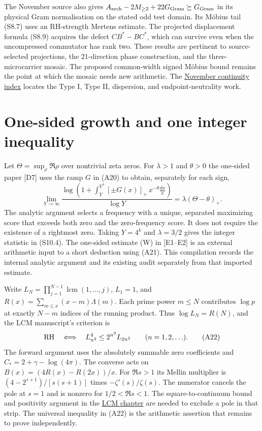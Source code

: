 \documentclass[
  10pt,
  a4paper,
  10pt,
  oneside,
  openany]{book}
\begin{document}
The November source also gives
\(A_{\rm arch}-2M_{\ge2}+22G_{\rm Gram}\succeq G_{\rm Gram}\) in its
physical Gram normalisation on the stated odd test domain. Its Möbius
tail (S8.7) uses an RH-strength Mertens estimate. The projected
displacement formula (S8.9) acquires the defect \(CB^*-BC^*\), which can
survive even when the uncompressed commutator has rank two. These
results are pertinent to source-selected projections, the 21-direction
phase construction, and the three-microcarrier mosaic. The proposed
common-width signed Möbius bound remains the point at which the mosaic
needs new arithmetic. The
\hyperref[november-1320-micro-results-the-detailed-continuity-index]{November
continuity index} locates the Type I, Type II, dispersion, and
endpoint-neutrality work.

\section{One-sided growth and one integer
inequality}\label{atlas-windows}

Let \(\Theta=\sup_\rho\Re\rho\) over nontrivial zeta zeros. For
\(\lambda>1\) and \(\theta>0\) the one-sided paper {[}D7{]} uses the
ramp \(G\) in (A20) to obtain, separately for each sign, \[
 \lim_{Y\to\infty}\frac{\log\!\left(1+
       \int_Y^{Y^\lambda}[\pm G(x)]_+\,x^{-\theta}\frac{dx}{x}\right)}
       {\log Y}=\lambda(\Theta-\theta)_+ .
 \tag{A21}\label{eq:A21}
\] The analytic argument selects a frequency with a unique, separated
maximizing score that exceeds both zero and the zero-frequency score. It
does not require the existence of a rightmost zero. Taking \(Y=4^k\) and
\(\lambda=3/2\) gives the integer statistic in (S10.4). The one-sided
estimate (W) in {[}E1--E2{]} is an external arithmetic input to a short
deduction using (A21). This compilation records the internal analytic
argument and its existing audit separately from that imported estimate.

Write \(L_N=\prod_{j=1}^{N-1}\operatorname{lcm}(1,\ldots,j)\),
\(L_1=1\), and \(R(x)=\sum_{m\le x}(x-m)\Lambda(m)\). Each prime power
\(m\le N\) contributes \(\log p\) at exactly \(N-m\) indices of the
running product. Thus \(\log L_N=R(N)\), and the LCM manuscript's
criterion is \[
 {\rm RH}\quad\Longleftrightarrow\quad
 L_{n^2}^4\le 2^{n^3}L_{2n^2}\qquad(n=1,2,\ldots).
 \tag{A22}\label{eq:A22}
\] The forward argument uses the absolutely summable zero coefficients
and \(C_*=2+\gamma-\log(4\pi)\). The converse acts on
\(B(x)=(4R(x)-R(2x))/x\). For \(\Re s>1\) its Mellin multiplier is
\((4-2^{s+1})/[s(s+1)]\) times \(-\zeta'(s)/\zeta(s)\). The numerator
cancels the pole at \(s=1\) and is nonzero for \(1/2<\Re s<1\). The
square-to-continuum bound and positivity argument in the
\hyperref[a-least-common-multiple-formulation-of-rh]{LCM chapter} are
needed to exclude a pole in that strip. The universal inequality in
(A22) is the arithmetic assertion that remains to prove independently.
\end{document}
